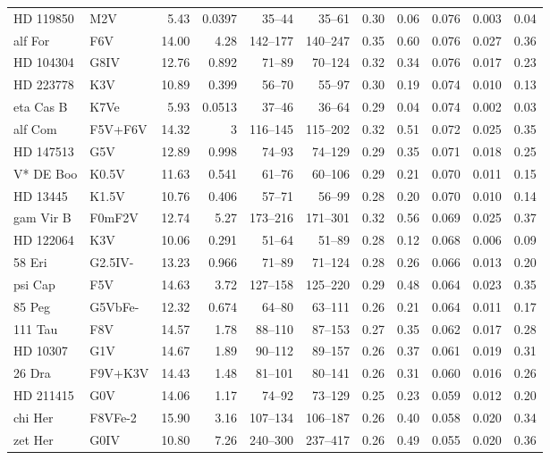 \documentclass[11pt,a4paper]{article}
\begin{document}
{\begin{longtable}{llrrrrrrrrr}
HD 119850 & M2V & 5.43 & 0.0397 & 35--44 & 35--61 & 0.30 & 0.06 & 0.076 & 0.003 & 0.04 \\
alf For & F6V & 14.00 & 4.28 & 142--177 & 140--247 & 0.35 & 0.60 & 0.076 & 0.027 & 0.36 \\
HD 104304 & G8IV & 12.76 & 0.892 & 71--89 & 70--124 & 0.32 & 0.34 & 0.076 & 0.017 & 0.23 \\
HD 223778 & K3V & 10.89 & 0.399 & 56--70 & 55--97 & 0.30 & 0.19 & 0.074 & 0.010 & 0.13 \\
eta Cas B & K7Ve & 5.93 & 0.0513 & 37--46 & 36--64 & 0.29 & 0.04 & 0.074 & 0.002 & 0.03 \\
alf Com & F5V+F6V & 14.32 & 3 & 116--145 & 115--202 & 0.32 & 0.51 & 0.072 & 0.025 & 0.35 \\
HD 147513 & G5V & 12.89 & 0.998 & 74--93 & 74--129 & 0.29 & 0.35 & 0.071 & 0.018 & 0.25 \\
V* DE Boo & K0.5V & 11.63 & 0.541 & 61--76 & 60--106 & 0.29 & 0.21 & 0.070 & 0.011 & 0.15 \\
HD  13445 & K1.5V & 10.76 & 0.406 & 57--71 & 56--99 & 0.28 & 0.20 & 0.070 & 0.010 & 0.14 \\
gam Vir B & F0mF2V & 12.74 & 5.27 & 173--216 & 171--301 & 0.32 & 0.56 & 0.069 & 0.025 & 0.37 \\
HD 122064 & K3V & 10.06 & 0.291 & 51--64 & 51--89 & 0.28 & 0.12 & 0.068 & 0.006 & 0.09 \\
58 Eri & G2.5IV- & 13.23 & 0.966 & 71--89 & 71--124 & 0.28 & 0.26 & 0.066 & 0.013 & 0.20 \\
psi Cap & F5V & 14.63 & 3.72 & 127--158 & 125--220 & 0.29 & 0.48 & 0.064 & 0.023 & 0.35 \\
85 Peg & G5VbFe- & 12.32 & 0.674 & 64--80 & 63--111 & 0.26 & 0.21 & 0.064 & 0.011 & 0.17 \\
111 Tau & F8V & 14.57 & 1.78 & 88--110 & 87--153 & 0.27 & 0.35 & 0.062 & 0.017 & 0.28 \\
HD  10307 & G1V & 14.67 & 1.89 & 90--112 & 89--157 & 0.26 & 0.37 & 0.061 & 0.019 & 0.31 \\
26 Dra & F9V+K3V & 14.43 & 1.48 & 81--101 & 80--141 & 0.26 & 0.31 & 0.060 & 0.016 & 0.26 \\
HD 211415 & G0V & 14.06 & 1.17 & 74--92 & 73--129 & 0.25 & 0.23 & 0.059 & 0.012 & 0.20 \\
chi Her & F8VFe-2 & 15.90 & 3.16 & 107--134 & 106--187 & 0.26 & 0.40 & 0.058 & 0.020 & 0.34 \\
zet Her & G0IV & 10.80 & 7.26 & 240--300 & 237--417 & 0.26 & 0.49 & 0.055 & 0.020 & 0.36 \\

\end{longtable}}
\end{document}
